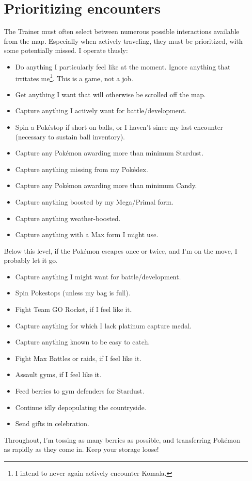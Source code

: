 \section{Prioritizing encounters}
\label{sec:prioritymap}
The Trainer must often select between numerous possible interactions available from the map.
Especially when actively traveling, they must be prioritized, with some potentially missed.
I operate thusly:
\begin{itemize}
\item Do anything I particularly feel like at the moment.
      Ignore anything that irritates me\footnote{I intend to never again actively encounter Komala.}.
      This is a game, not a job.
\item Get anything I want that will otherwise be scrolled off the map.
\item Capture anything I actively want for battle/development.
\item Spin a Pokéstop if short on balls, or I haven't since my last encounter (necessary to sustain ball inventory).
\item Capture any Pokémon awarding more than minimum Stardust.
\item Capture anything missing from my Pokédex.
\item Capture any Pokémon awarding more than minimum Candy.
\item Capture anything boosted by my Mega/Primal form.
\item Capture anything weather-boosted.
\item Capture anything with a Max form I might use.
\end{itemize}
Below this level, if the Pokémon escapes once or twice, and I'm on the move,
I probably let it go.
\begin{itemize}
\item Capture anything I might want for battle/development.
\item Spin Pokestops (unless my bag is full).
\item Fight Team GO Rocket, if I feel like it.
\item Capture anything for which I lack platinum capture medal.
\item Capture anything known to be easy to catch.
\item Fight Max Battles or raids, if I feel like it.
\item Assault gyms, if I feel like it.
\item Feed berries to gym defenders for Stardust.
\item Continue idly depopulating the countryside.
\item Send gifts in celebration.
\end{itemize}
Throughout, I'm tossing as many berries as possible, and
 transferring Pokémon as rapidly as they come in.
Keep your storage loose!

